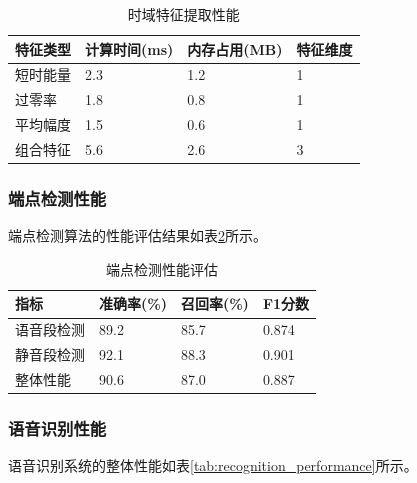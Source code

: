 \documentclass[sigconf,nonacm]{acmart}
\begin{document}
\begin{table}[htbp]
\caption{时域特征提取性能}
\label{tab:feature_performance}
\begin{center}
\begin{tabular}{|p{1.2cm}|p{1.2cm}|p{1.2cm}|p{1.2cm}|}
\hline
\textbf{特征类型} & \textbf{计算时间(ms)} & \textbf{内存占用(MB)} & \textbf{特征维度} \\
\hline
短时能量 & 2.3 & 1.2 & 1 \\
\hline
过零率 & 1.8 & 0.8 & 1 \\
\hline
平均幅度 & 1.5 & 0.6 & 1 \\
\hline
组合特征 & 5.6 & 2.6 & 3 \\
\hline
\end{tabular}
\end{center}
\end{table}

\subsubsection{端点检测性能}

端点检测算法的性能评估结果如表\ref{tab:endpoint_performance}所示。

\begin{table}[htbp]
\caption{端点检测性能评估}
\label{tab:endpoint_performance}
\begin{center}
\begin{tabular}{|p{1.2cm}|p{1.2cm}|p{1.2cm}|p{1.2cm}|}
\hline
\textbf{指标} & \textbf{准确率(\%)} & \textbf{召回率(\%)} & \textbf{F1分数} \\
\hline
语音段检测 & 89.2 & 85.7 & 0.874 \\
\hline
静音段检测 & 92.1 & 88.3 & 0.901 \\
\hline
整体性能 & 90.6 & 87.0 & 0.887 \\
\hline
\end{tabular}
\end{center}
\end{table}

\subsubsection{语音识别性能}

语音识别系统的整体性能如表\ref{tab:recognition_performance}所示。
\end{document}
